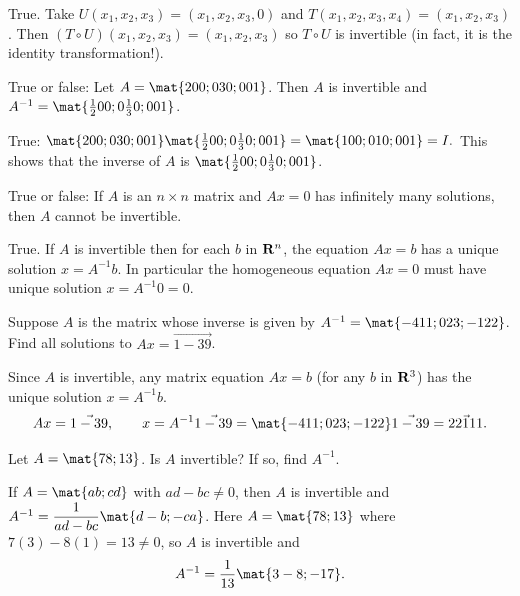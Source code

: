 \begin{problems}
\begin{solution}
  True.  Take $U(x_1, x_2, x_3)= (x_1, x_2, x_3, 0)$ and
  $T(x_1, x_2, x_3, x_4)= (x_1, x_2, x_3)$.  Then
  $(T \circ U)(x_1, x_2, x_3)= (x_1, x_2, x_3)$ so $T \circ U$ is invertible (in
  fact, it is the identity transformation!).
\end{solution}


    
\problem %
True or false: Let $A = \mat{2 0 0; 0 3 0; 0 0 1}$. Then $A$ is 
invertible and $A^{-1} = \mat{\frac{1}{2} 0 0; 0 \frac{1}{3} 0; 0 0 1}$. 

\begin{solution}
True:
    $\mat{2 0 0; 0 3 0; 0 0 1} \mat{\frac{1}{2} 0 0; 0 \frac{1}{3} 0;
      0 0 1} = \mat{1 0 0; 0 1 0; 0 0 1}=I.$ \newline This shows that
    the inverse of $A$ is
    $\mat{\frac{1}{2} 0 0; 0 \frac{1}{3} 0; 0 0 1}$. %
\end{solution}

\problem %
True or false: If $A$ is an $n \times n$ matrix and $Ax = 0$ has 
infinitely many solutions, then $A$ cannot be invertible.

\begin{solution}
True.  If $A$ is invertible then for each $b$ in
    ${\bf R}^n$, the equation $Ax=b$ has a unique solution
    $x = A^{-1}b$.  In particular the homogeneous equation $Ax=0$ must
    have unique solution $x= A^{-1}0 = 0$.   
\end{solution}

\problem %
Suppose $A$ is the matrix whose inverse is given by
$A^{-1} = \mat{-4 1 1; 0 2 3; -1 2 2}$.  \newline %
Find all solutions to $Ax = \vec{1 -3 9}$. \newline %
\begin{solution}
Since $A$ is invertible, any matrix equation $Ax = b$ (for any $b$ in ${\bf R}^3$) has the unique solution $x = A^{-1} b$.  
\[Ax = \vec{1 -3 9}, \qquad x = A^{-1}\vec{1 -3 9}
= \mat{-4 1 1; 0 2 3; -1 2 2} \vec{1 -3 9} = 
\vec{2 21 11}.\]
\end{solution}

\problem %
Let $A = \mat{7 8; 1 3}$. Is $A$ invertible?  If so, find $A^{-1}$.
\newline %
\begin{solution}
If $A = \mat{a b; c d}$ with $ad - bc \neq 0$, then $A$ is invertible and
$A^{-1} = \dfrac{1}{ad-bc}\mat{d -b; -c a}$. \newline
Here $A=\mat{7 8; 1 3}$ where $7(3)-8(1) = 13 \neq 0$, so $A$ is 
invertible and 
\[A^{-1} = \dfrac{1}{13} \mat{3 -8; -1 7}.\]
\end{solution}




\end{problems}
